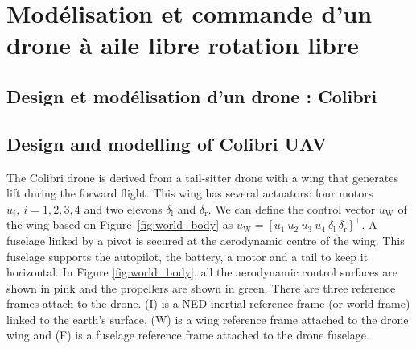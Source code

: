 \chapter{Modélisation et commande d'un drone à aile libre rotation libre}
\minitoc

\section{Design et modélisation d'un drone : Colibri}
\section{Design and modelling of Colibri UAV}
\label{sec:model_colibri}
The Colibri drone is derived from a tail-sitter drone with a wing that generates lift during the forward flight. This wing has several actuators: four motors $u_{i}, ~i = 1,2,3,4$ and two elevons $\delta_{\text{l}}$ and $\delta_{\text{r}}$. We can define the control vector $u_{\text{W}}$ of the wing based on Figure~\ref{fig:world_body} as $u_{\text{W}} = [u_{1}~u_{2}~u_{3}~u_{4}~\delta_{\text{l}}~\delta_{\text{r}}]^\top$. A fuselage linked by a pivot is secured at the aerodynamic centre of the wing. This fuselage supports the autopilot, the battery, a motor and a tail to keep it horizontal. In Figure \ref{fig:world_body}, all the aerodynamic control surfaces are shown in pink and the propellers are shown in green.
There are three reference frames attach to the drone. (I) is a NED inertial reference frame (or world frame) linked to the earth's surface, (W) is a wing reference frame attached to the drone wing and (F) is a fuselage reference frame attached to the drone fuselage.




